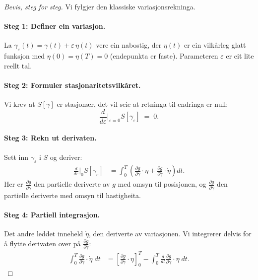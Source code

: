 \begin{proof}[Bevis, steg for steg]
Vi fylgjer den klassiske variasjonsrekninga.

\paragraph{Steg 1: Definer ein variasjon.}
La $\gamma_\varepsilon(t) = \gamma(t) + \varepsilon \, \eta(t)$
vere ein nabostig, der $\eta(t)$ er ein vilkårleg glatt funksjon
med $\eta(0) = \eta(T) = 0$ (endepunkta er faste). Parameteren
$\varepsilon$ er eit lite reellt tal.

\paragraph{Steg 2: Formuler stasjonaritetsvilkåret.}
Vi krev at $S[\gamma]$ er stasjonær, det vil seie at retninga
til endringa er null:
\[
  \frac{d}{d\varepsilon}\bigg|_{\varepsilon=0}
  S[\gamma_\varepsilon] \;=\; 0.
\]

\paragraph{Steg 3: Rekn ut derivaten.}
Sett inn $\gamma_\varepsilon$ i $S$ og deriver:
\begin{align*}
  \frac{d}{d\varepsilon}\bigg|_{0} S[\gamma_\varepsilon]
  &= \int_0^T \!\left(
    \frac{\partial g}{\partial \gamma} \cdot \eta
    + \frac{\partial g}{\partial \dot{\gamma}} \cdot \dot{\eta}
  \right) dt.
\end{align*}
Her er $\frac{\partial g}{\partial \gamma}$ den partielle
deriverte av $g$ med omsyn til posisjonen, og
$\frac{\partial g}{\partial \dot{\gamma}}$ den partielle
deriverte med omsyn til hastigheita.

\paragraph{Steg 4: Partiell integrasjon.}
Det andre leddet inneheld $\dot{\eta}$, den deriverte av
variasjonen. Vi integrerer delvis for å flytte derivaten over på
$\frac{\partial g}{\partial \dot{\gamma}}$:
\begin{align*}
  \int_0^T \frac{\partial g}{\partial \dot{\gamma}}
    \cdot \dot{\eta}\; dt
  &= \left[\frac{\partial g}{\partial \dot{\gamma}}
    \cdot \eta \right]_0^T
    - \int_0^T \frac{d}{dt}
      \frac{\partial g}{\partial \dot{\gamma}}
      \cdot \eta \; dt.
\end{align*}


\end{proof}
